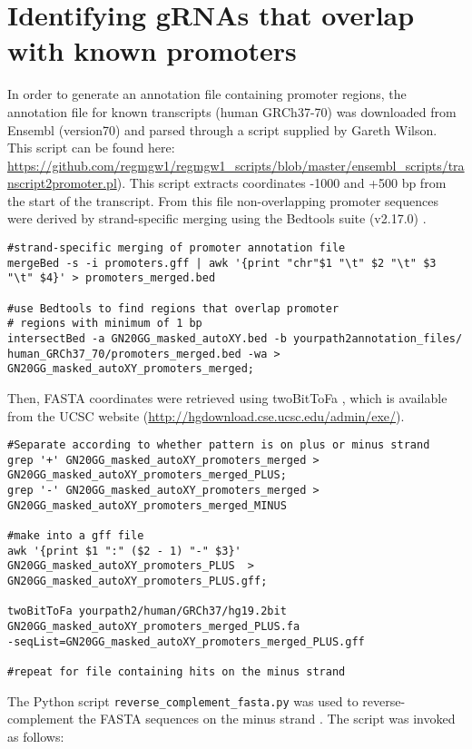 \section{Identifying gRNAs that overlap with known promoters}

In order to generate an annotation file containing promoter regions,  the annotation file for known transcripts (human GRCh37-70) was downloaded from Ensembl (version70) and parsed through a script supplied by Gareth Wilson. This script can be found here: \url{https://github.com/regmgw1/regmgw1_scripts/blob/master/ensembl_scripts/transcript2promoter.pl}). This script extracts coordinates -1000 and +500 bp from the start of the transcript. From this file non-overlapping promoter sequences were derived by strand-specific merging using the Bedtools suite (v2.17.0) \cite{Quinlan:2010km}.

\begin{lstlisting}
#strand-specific merging of promoter annotation file
mergeBed -s -i promoters.gff | awk '{print "chr"$1 "\t" $2 "\t" $3 "\t" $4}' > promoters_merged.bed 

#use Bedtools to find regions that overlap promoter 
# regions with minimum of 1 bp 
intersectBed -a GN20GG_masked_autoXY.bed -b yourpath2annotation_files/
human_GRCh37_70/promoters_merged.bed -wa >
GN20GG_masked_autoXY_promoters_merged;
\end{lstlisting}

Then, FASTA coordinates were retrieved using twoBitToFa \cite{Kent:2002bw}, which is available from the UCSC website (\url{http://hgdownload.cse.ucsc.edu/admin/exe/}).

\begin{lstlisting}
#Separate according to whether pattern is on plus or minus strand
grep '+' GN20GG_masked_autoXY_promoters_merged >
GN20GG_masked_autoXY_promoters_merged_PLUS; 
grep '-' GN20GG_masked_autoXY_promoters_merged >
GN20GG_masked_autoXY_promoters_merged_MINUS 

#make into a gff file
awk '{print $1 ":" ($2 - 1) "-" $3}' GN20GG_masked_autoXY_promoters_PLUS  >
GN20GG_masked_autoXY_promoters_PLUS.gff;

twoBitToFa yourpath2/human/GRCh37/hg19.2bit
GN20GG_masked_autoXY_promoters_merged_PLUS.fa 
-seqList=GN20GG_masked_autoXY_promoters_merged_PLUS.gff 

#repeat for file containing hits on the minus strand
\end{lstlisting}

The Python script \verb|reverse_complement_fasta.py| was used to reverse-complement the FASTA sequences on the minus strand \cite{Kao:Online}. The script was invoked as follows:


